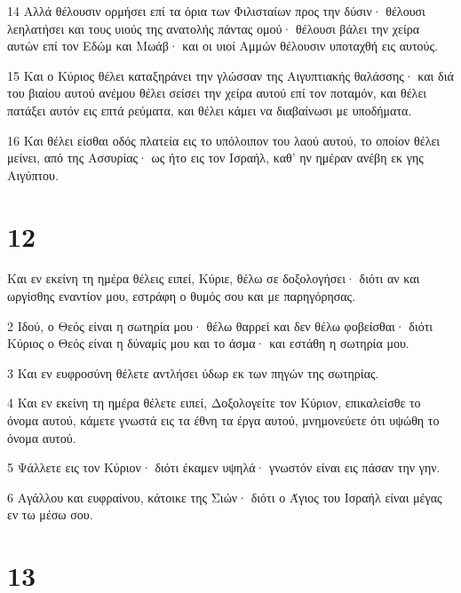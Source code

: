 \par 14 Αλλά θέλουσιν ορμήσει επί τα όρια των Φιλισταίων προς την δύσιν· θέλουσι λεηλατήσει και τους υιούς της ανατολής πάντας ομού· θέλουσι βάλει την χείρα αυτών επί τον Εδώμ και Μωάβ· και οι υιοί Αμμών θέλουσιν υποταχθή εις αυτούς.
\par 15 Και ο Κύριος θέλει καταξηράνει την γλώσσαν της Αιγυπτιακής θαλάσσης· και διά του βιαίου αυτού ανέμου θέλει σείσει την χείρα αυτού επί τον ποταμόν, και θέλει πατάξει αυτόν εις επτά ρεύματα, και θέλει κάμει να διαβαίνωσι με υποδήματα.
\par 16 Και θέλει είσθαι οδός πλατεία εις το υπόλοιπον του λαού αυτού, το οποίον θέλει μείνει, από της Ασσυρίας· ως ήτο εις τον Ισραήλ, καθ' ην ημέραν ανέβη εκ γης Αιγύπτου.

\chapter{12}

\par Και εν εκείνη τη ημέρα θέλεις ειπεί, Κύριε, θέλω σε δοξολογήσει· διότι αν και ωργίσθης εναντίον μου, εστράφη ο θυμός σου και με παρηγόρησας.
\par 2 Ιδού, ο Θεός είναι η σωτηρία μου· θέλω θαρρεί και δεν θέλω φοβείσθαι· διότι Κύριος ο Θεός είναι η δύναμίς μου και το άσμα· και εστάθη η σωτηρία μου.
\par 3 Και εν ευφροσύνη θέλετε αντλήσει ύδωρ εκ των πηγών της σωτηρίας.
\par 4 Και εν εκείνη τη ημέρα θέλετε ειπεί, Δοξολογείτε τον Κύριον, επικαλείσθε το όνομα αυτού, κάμετε γνωστά εις τα έθνη τα έργα αυτού, μνημονεύετε ότι υψώθη το όνομα αυτού.
\par 5 Ψάλλετε εις τον Κύριον· διότι έκαμεν υψηλά· γνωστόν είναι εις πάσαν την γην.
\par 6 Αγάλλου και ευφραίνου, κάτοικε της Σιών· διότι ο Άγιος του Ισραήλ είναι μέγας εν τω μέσω σου.

\chapter{13}

